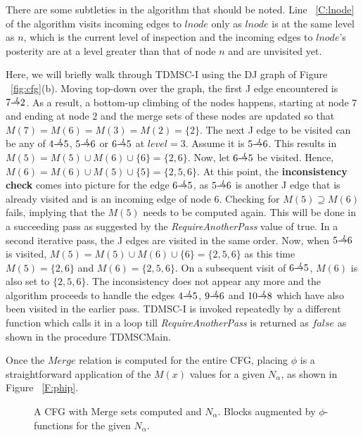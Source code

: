 {There are some subtleties in the algorithm that should be noted. Line ~\ref{C:lnode} of the algorithm visits incoming edges to $lnode$ only as $lnode$ is at the same level as $n$, which is the current level of inspection and the incoming edges to $lnode$'s posterity are at a level greater than that of node $n$ and are unvisited yet. 

Here, we will briefly walk through TDMSC-I using the DJ graph of Figure ~\ref{fig:cfg}(b). Moving top-down over the graph, the first J edge encountered is $7 \st{J} 2$. As a result, a bottom-up climbing of the nodes happens, starting at node $7$ and
ending at node $2$ and the merge sets of these nodes are updated so that $M(7) = M(6) = M(3) = M(2) = \{2\}$. The next J edge
to be visited can be any of $4 \st{J} 5$, $5 \st{J} 6$ or $6 \st{J} 5$ at $level = 3$. Assume it is $5 \st{J} 6$. This results in $M(5) = M(5) \cup M(6) \cup \{6\} = \{2,6\}$. Now, let $6 \st{J} 5$ be visited. Hence, $M(6) = M(6) \cup M(5) \cup \{5\} = \{2,5,6\}$. At this point, the {\bf inconsistency check} comes into picture for the edge $6 \st{J} 5$, as $5 \st{J} 6$ is another J edge that is already visited and is an incoming edge of node $6$. Checking for $M(5) \supseteq M(6)$ fails, implying that the $M(5)$ needs to be computed again. This will be done in a succeeding pass as suggested by the {\it RequireAnotherPass} value of true. In a second iterative pass, the J edges are visited in the same order. Now, when $5 \st{J} 6$ is visited, 
$M(5) = M(5) \cup M(6) \cup \{6\} = \{2,5,6\}$ as this time 
$M(5) = \{2,6\}$ 
and $M(6) = \{2,5,6\}$. On a subsequent visit of $6 \st{J} 5$, $M(6)$ is also set to $\{2,5,6\}$. The inconsistency does not appear any more and the algorithm proceeds to handle the edges $4 \st{J} 5$, $9 \st{J} 6$ and $10 \st{J} 8$ which have
also been visited in the earlier pass. TDMSC-I is invoked repeatedly by a different function
which calls it in a loop till {\it RequireAnotherPass} is returned as $false$ as shown in the procedure TDMSCMain.

Once the $Merge$ relation is computed for the entire CFG, placing $\phi$ is a straightforward application of the $M(x)$ values for a given $N_{\alpha}$, as shown in Figure ~\ref{F:phip}.
\begin{figure}[!ht]
\centering
\begin{minipage}[t]{5in}
 A CFG with Merge sets computed and $N_{\alpha}$.
 Blocks augmented by $\phi$-functions for the given $N_{\alpha}$.


\end{minipage}
\end{figure}}

